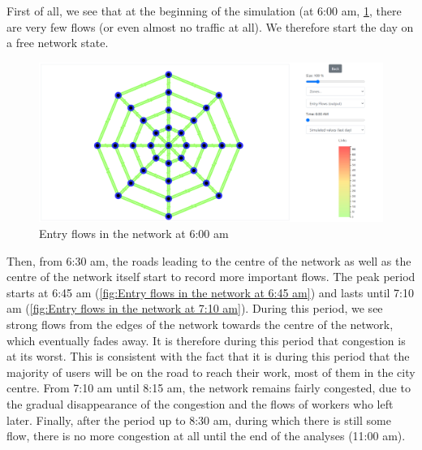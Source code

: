 \documentclass[a4paper, 12pt,oneside]{article}
\begin{document}
First of all, we see that at the beginning of the simulation (at 6:00 am, \ref{fig:Entry flows in the network at 6:00 am}, there are very few flows (or even almost no traffic at all). We therefore start the day on a free network state.\\

\begin{figure}[H]
    \centring
    \includegraphics[width=1\textwidth]{Images/Step2/results_on_network_600am.png}
    \caption{Entry flows in the network at 6:00 am}
    \label{fig:Entry flows in the network at 6:00 am}
\end{figure}

Then, from 6:30 am, the roads leading to the centre of the network as well as the centre of the network itself start to record more important flows. The peak period starts at 6:45 am (\ref{fig:Entry flows in the network at 6:45 am}) and lasts until 7:10 am (\ref{fig:Entry flows in the network at 7:10 am}). During this period, we see strong flows from the edges of the network towards the centre of the network, which eventually fades away. It is therefore during this period that congestion is at its worst. This is consistent with the fact that it is during this period that the majority of users will be on the road to reach their work, most of them in the city centre. From 7:10 am until 8:15 am, the network remains fairly congested, due to the gradual disappearance of the congestion and the flows of workers who left later. Finally, after the period up to 8:30 am, during which there is still some flow, there is no more congestion at all until the end of the analyses (11:00 am).\\
\end{document}
